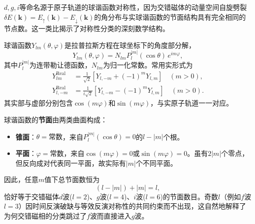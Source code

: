 $d, g, i$等命名源于原子轨道的球谐函数对称性，因为交错磁体的动量空间自旋劈裂$\delta E(\mathbf{k}) = E_{\uparrow}(\mathbf{k}) - E_{\downarrow}(\mathbf{k})$的角分布与实球谐函数的节面结构具有完全相同的节点数。这一类比揭示了对称性分类的深刻数学结构\cite{Smejkal2022PRX}。

球谐函数$Y_{lm}(\theta,\varphi)$是拉普拉斯方程在球坐标下的角度部分解，
\begin{equation}
Y_{lm}(\theta,\varphi) = N_{lm} P_l^{|m|}(\cos\theta) \, e^{im\varphi},
\end{equation}
其中$P_l^{|m|}$为连带勒让德函数，$N_{lm}$为归一化常数。常用实形式为
\[
\begin{aligned}
Y_{lm}^{\text{Real}} &= \frac{1}{\sqrt{2}} \left[ Y_{l,-m} + (-1)^m Y_{l,m} \right] \quad (m>0), \\
Y_{l,-m}^{\text{Real}} &= \frac{1}{i\sqrt{2}} \left[ Y_{l,-m} - (-1)^m Y_{l,m} \right] \quad (m>0).
\end{aligned}
\]
其实部与虚部分别包含$\cos(m\varphi)$和$\sin(m\varphi)$，与实原子轨道一一对应。

球谐函数的\textbf{节面}由两类曲面构成：
\begin{itemize}
    \item \textbf{锥面}：$\theta = \text{常数}$，来自$P_l^{|m|}(\cos\theta)=0$的$l-|m|$个根。
    \item \textbf{平面}：$\varphi = \text{常数}$，来自$\cos(m\varphi)=0$或$\sin(m\varphi)=0$。虽有$2|m|$个零点，但反向成对代表同一平面，故实际有$|m|$个不同平面。
\end{itemize}
因此，任意$m$值下总节面数恒为
\begin{equation}
(l-|m|) + |m| = l,
\end{equation}
恰好等于交错磁体$d$波($l=2$)、$g$波($l=4$)、$i$波($l=6$)的节面数目。奇数$l$（例如$f$波$l=3$）因时间反演破缺与等效反演对称性的共同约束而不出现，这自然地解释了为何交错磁相的分类跳过了$f$波而直接进入$g$波。